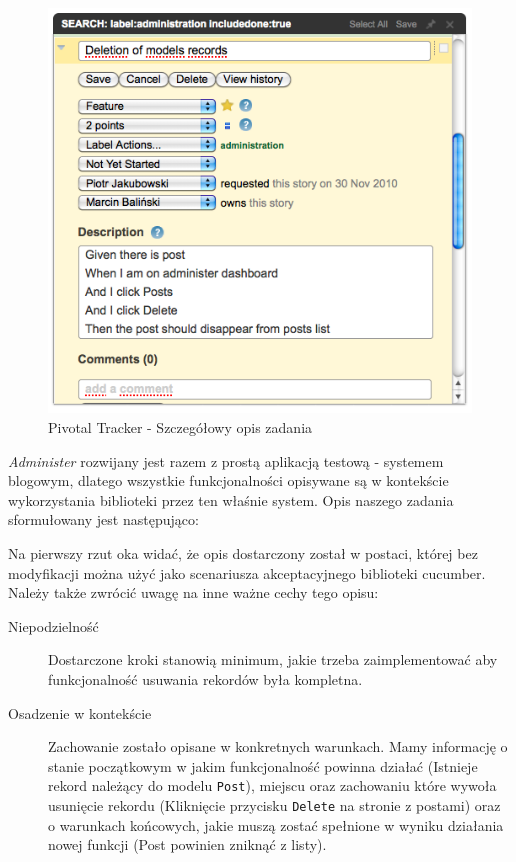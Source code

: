     \vspace{5 mm}
    \begin{figure}[h]
  		\begin{center}
  			\includegraphics[width=0.8\linewidth]{images/administer_story_desc.png}
  			\caption{Pivotal Tracker - Szczegółowy opis zadania}
  			\label{administer_story_desc}
  		\end{center}
  	\end{figure}
    
    \emph{Administer} rozwijany jest razem z prostą aplikacją testową - systemem blogowym, dlatego wszystkie funkcjonalności opisywane są w kontekście wykorzystania biblioteki przez ten właśnie system. Opis naszego zadania sformułowany jest następująco:
    
    
    
    Na pierwszy rzut oka widać, że opis dostarczony został w postaci, której bez modyfikacji można użyć jako scenariusza akceptacyjnego biblioteki cucumber. Należy także zwrócić uwagę na inne ważne cechy tego opisu:
    
    \begin{description}
      \item[Niepodzielność] Dostarczone kroki stanowią minimum, jakie trzeba zaimplementować aby funkcjonalność usuwania rekordów była kompletna.
      \item[Osadzenie w kontekście] Zachowanie zostało opisane w konkretnych warunkach. Mamy informację o stanie początkowym w jakim funkcjonalność powinna działać (Istnieje rekord należący do modelu \texttt{Post}), miejscu oraz zachowaniu które wywoła usunięcie rekordu (Kliknięcie przycisku \texttt{Delete} na stronie z postami) oraz o warunkach końcowych, jakie muszą zostać spełnione w wyniku działania nowej funkcji (Post powinien zniknąć z listy).
    \end{description}
  	
